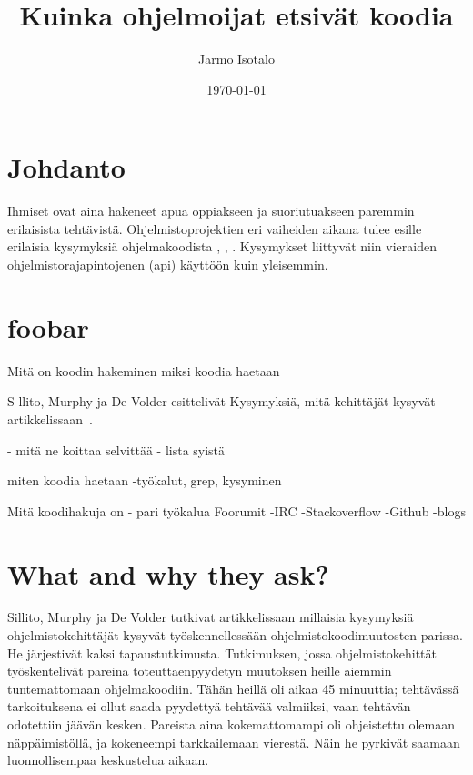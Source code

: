 \documentclass[finnish]{../tktltiki2}
\title{Kuinka ohjelmoijat etsivät koodia}
\author{Jarmo Isotalo}
\date{\today}
\theoremstyle{definition}
\theoremstyle{remark}
\begin{document}

\frontmatter      %

\maketitle        %

\tableofcontents  %


\mainmatter       %

\section{Johdanto}
Ihmiset ovat aina hakeneet apua oppiakseen ja suoriutuakseen paremmin erilaisista tehtävistä. %
Ohjelmistoprojektien eri vaiheiden aikana tulee esille erilaisia kysymyksiä ohjelmakoodista \cite{g_search_code}, \cite{questions-during-software-evolution-tasks}, \cite{asking-and-answering-api-questions}.
Kysymykset liittyvät niin vieraiden ohjelmistorajapintojenen (api) käyttöön \cite{jungloid-mining} kuin yleisemmin.

\section{foobar}
Mitä on koodin hakeminen
miksi koodia haetaan

S
llito, Murphy ja De Volder esittelivät Kysymyksiä, mitä kehittäjät kysyvät artikkelissaan~\cite{questions-during-software-evolution-tasks}.

- mitä ne koittaa selvittää
  - lista syistä

miten koodia haetaan
-työkalut, grep, kysyminen

Mitä koodihakuja on
- pari työkalua
Foorumit
-IRC
-Stackoverflow
-Github
-blogs

\section{What and why they ask?}
Sillito, Murphy ja De Volder tutkivat artikkelissaan \cite{questions-during-software-evolution-tasks} millaisia kysymyksiä ohjelmistokehittäjät kysyvät työskennellessään ohjelmistokoodimuutosten parissa.
He järjestivät kaksi tapaustutkimusta. Tutkimuksen, jossa ohjelmistokehittät työskentelivät pareina toteuttaenpyydetyn muutoksen heille aiemmin tuntemattomaan ohjelmakoodiin. Tähän heillä oli aikaa 45 minuuttia; tehtävässä tarkoituksena ei ollut saada pyydettyä tehtävää valmiiksi, vaan tehtävän odotettiin jäävän kesken. Pareista aina kokemattomampi oli ohjeistettu olemaan näppäimistöllä, ja kokeneempi tarkkailemaan vierestä. Näin he pyrkivät saamaan luonnollisempaa keskustelua aikaan.
\end{document}
